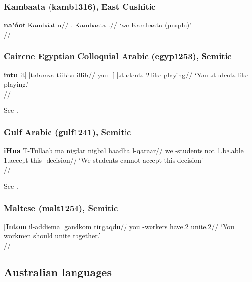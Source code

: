 \documentclass[A4paper]{article}
\begin{document}
\subsubsection{Kambaata (kamb1316), East Cushitic}

\ex 
\begingl
\gla \textbf{na'óot} Kambáat-u//
\Pl.\Nom{} Kambaata-\M.\Nom{}//
\glft `we Kambaata (people)' \\\citep[335, (1097)]{treis2008}//
\endgl
\xe

\subsubsection{Cairene Egyptian Colloquial Arabic (egyp1253), Semitic}

\ex
\begingl
\gla \textbf{\textglotstop{}intu} \textglotstop{}it[-]talamza ti\textcrh{}ibbu \textglotstop{}illi\textrevglotstop{}b//
\glb you.\Pl{} [\Def-]students 2\Pl{}.like playing//
\glft `You students like playing.'\\\citep[80, (533)]{garygamal1982}//
\endgl
\xe

See \citealp[78; 80]{garygamal1982}.

\subsubsection{Gulf Arabic (gulf1241), Semitic}


\ex
\begingl
\gla \textbf{iHna} T-Tullaab ma nigdar nigbal haadha l-qaraar//
\glb we \Def-students not 1\Pl.be.able 1\Pl.accept this \Def-decision//
\glft `We students cannot accept this decision'\\\citep[165, (845)]{holes1990}//
\endgl
\xe


See \citealp[162, 165]{holes1990}.

\subsubsection{Maltese (malt1254), Semitic}

\ex
\begingl
\gla {}[\textbf{Intom} il-\textcrh{}addiema] g\textcrh{}andkom ting\textcrh{}aqdu//
\glb you \Def-workers have.2\Pl{} unite.2\Pl{}//
\glft `You workmen should unite together.' \\{\citep[202, (915)]{borgazzopardialexander1997}}//
\endgl
\xe 


\subsection{Australian languages}
\end{document}
